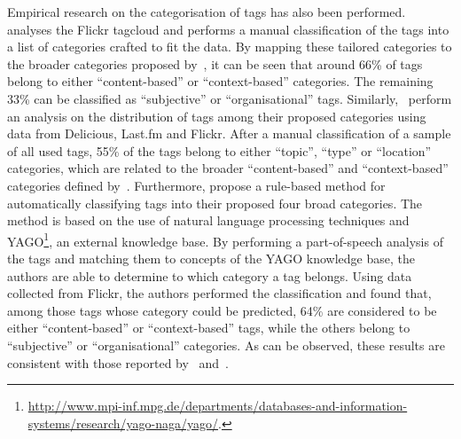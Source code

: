 Empirical research on the categorisation of tags has also been performed. \cite{Simons2008} analyses the Flickr tagcloud and performs a manual classification of the tags into a list of categories crafted to fit the data. By mapping these tailored categories to the broader categories proposed by~\cite{cantador2010}, it can be seen that around 66\% of tags belong to either ``content-based'' or ``context-based'' categories. The remaining 33\% can be classified as ``subjective'' or ``organisational'' tags. 
Similarly,~\cite{Bischoff2008} perform an analysis on the distribution of tags among their proposed categories using data from Delicious, Last.fm and Flickr. After a manual classification of a sample of all used tags, 55\% of the tags belong to either ``topic'', ``type'' or ``location'' categories, which are related to the broader ``content-based'' and ``context-based'' categories defined by~\cite{cantador2010}.
Furthermore, \cite{cantador2010} propose a rule-based method for automatically classifying tags into their proposed four broad categories. The method is based on the use of natural language processing techniques and YAGO\footnote{\url{http://www.mpi-inf.mpg.de/departments/databases-and-information-systems/research/yago-naga/yago/}.}, an external knowledge base. By performing a part-of-speech analysis of the tags and matching them to concepts of the YAGO knowledge base, the authors are able to determine to which category a tag belongs. Using data collected from Flickr, the authors performed the classification and found that, among those tags whose category could be predicted, 64\% are considered to be either ``content-based'' or ``context-based'' tags, while the others belong to ``subjective'' or ``organisational'' categories. As can be observed, these results are consistent with those reported by~\cite{Simons2008} and~\cite{Bischoff2008}.

